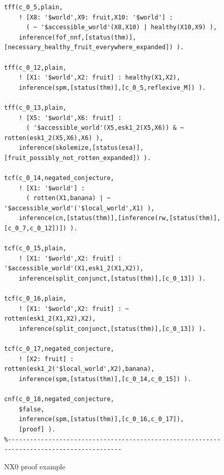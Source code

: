 \documentclass{ceurart}
\begin{document}
\begin{figure}[h!]
{{\begin{verbatim}
tff(c_0_5,plain,
    ! [X8: '$world',X9: fruit,X10: '$world'] :
      ( ~ '$accessible_world'(X8,X10) | healthy(X10,X9) ),
    inference(fof_nnf,[status(thm)],[necessary_healthy_fruit_everywhere_expanded]) ).

tff(c_0_12,plain,
    ! [X1: '$world',X2: fruit] : healthy(X1,X2),
    inference(spm,[status(thm)],[c_0_5,reflexive_M]) ).

tff(c_0_13,plain,
    ! [X5: '$world',X6: fruit] :
      ( '$accessible_world'(X5,esk1_2(X5,X6)) & ~ rotten(esk1_2(X5,X6),X6) ),
    inference(skolemize,[status(esa)],[fruit_possibly_not_rotten_expanded]) ).

tcf(c_0_14,negated_conjecture,
    ! [X1: '$world'] :
      ( rotten(X1,banana) | ~ '$accessible_world'('$local_world',X1) ),
    inference(cn,[status(thm)],[inference(rw,[status(thm)],[c_0_7,c_0_12])]) ).

tcf(c_0_15,plain,
    ! [X1: '$world',X2: fruit] : '$accessible_world'(X1,esk1_2(X1,X2)),
    inference(split_conjunct,[status(thm)],[c_0_13]) ).

tcf(c_0_16,plain,
    ! [X1: '$world',X2: fruit] : ~ rotten(esk1_2(X1,X2),X2),
    inference(split_conjunct,[status(thm)],[c_0_13]) ).

tcf(c_0_17,negated_conjecture,
    ! [X2: fruit] : rotten(esk1_2('$local_world',X2),banana),
    inference(spm,[status(thm)],[c_0_14,c_0_15]) ).

cnf(c_0_18,negated_conjecture,
    $false,
    inference(spm,[status(thm)],[c_0_16,c_0_17]),
    [proof] ).
%------------------------------------------------------------------------------------------
\end{verbatim}
}}
\caption{NX0 proof example}
\label{NX0Proof}
\end{figure}
\end{document}
